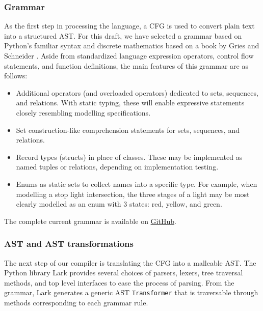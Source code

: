 \documentclass{article}
\begin{document}
\subsubsection{Grammar}

As the first step in processing the language, a CFG is used to convert plain text into a structured AST. For this draft, we have selected a grammar based on Python's familiar syntax \cite{pythonGrammar} and discrete mathematics based on a book by Gries and Schneider \cite{griesAndSchneider}. Aside from standardized language expression operators, control flow statements, and function definitions, the main features of this grammar are as follows:
\begin{itemize}
  \item Additional operators (and overloaded operators) dedicated to sets, sequences, and relations. With static typing, these will enable expressive statements closely resembling modelling specifications.
  \item Set construction-like comprehension statements for sets, sequences, and relations.
  \item Record types (structs) in place of classes. These may be implemented as named tuples or relations, depending on implementation testing.
  \item Enums as static sets to collect names into a specific type. For example, when modelling a stop light intersection, the three stages of a light may be most clearly modelled as an enum with 3 states: red, yellow, and green.
\end{itemize}

The complete current grammar is available on \href{https://github.com/Ant13731/compilers/blob/main/implementation/grammar.lark}{GitHub}.

\subsubsection{AST and AST transformations}

The next step of our compiler is translating the CFG into a malleable AST. The Python library Lark \cite{lark} provides several choices of parsers, lexers, tree traversal methods, and top level interfaces to ease the process of parsing. From the grammar, Lark generates a generic AST \texttt{Transformer} that is traversable through methods corresponding to each grammar rule.
\end{document}
